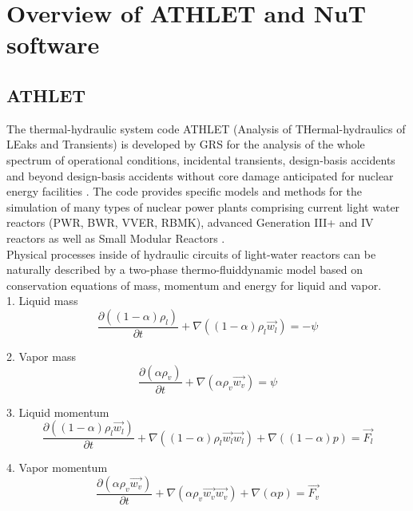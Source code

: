 \chapter{Overview of ATHLET and NuT software}\label{chapter:athlet-nut}

\section{ATHLET}


The thermal-hydraulic system code ATHLET (Analysis of THermal-hydraulics of LEaks and Transients) is developed by GRS for the analysis of the whole spectrum of operational conditions, incidental transients, design-basis accidents and beyond design-basis accidents without core damage anticipated for nuclear energy facilities \cite{grs:athlet-info}. The code provides specific models and methods for the simulation of many types of nuclear power plants comprising current light water reactors (PWR, BWR, VVER, RBMK), advanced Generation III+ and IV reactors as well as Small Modular Reactors \cite{grs:athlet-info}.\\


Physical processes inside of hydraulic circuits of light-water reactors can be naturally described by a two-phase thermo-fluiddynamic model based on conservation equations of mass, momentum and energy for liquid and vapor.\\

1. Liquid mass
\begin{equation} \label{eq:athlet-1}
\frac{\partial ((1-\alpha)\rho_{l})}{\partial t} + \nabla ((1-\alpha) \rho_{l} \vec{w_{l}}) = - \psi
\end{equation}


2. Vapor mass
\begin{equation} \label{eq:athlet-2}
\frac{\partial (\alpha \rho_{v})}{\partial t} + \nabla (\alpha \rho_{v} \vec{w_{v}}) = \psi
\end{equation}


3. Liquid momentum
\begin{equation} \label{eq:athlet-3}
\frac{\partial ((1-\alpha) \rho_{l} \vec{w_{l}})}{\partial t} + \nabla ((1-\alpha) \rho_{l} \vec{w_{l}} \vec{w_{l}}) + \nabla ((1 - \alpha)p) = \vec{F_{l}}
\end{equation}


4. Vapor momentum
\begin{equation} \label{eq:athlet-4}
\frac{\partial (\alpha \rho_{v} \vec{w_{v}})}{\partial t} + \nabla (\alpha \rho_{v} \vec{w_{v}} \vec{w_{v}}) + \nabla (\alpha p) = \vec{F_{v}}
\end{equation}


